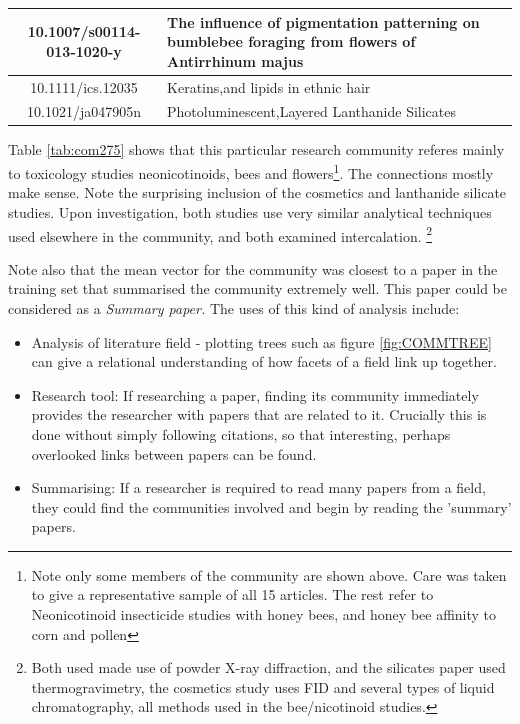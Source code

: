 \begin{table}[H]
\begin{tabular}{||c|p{10cm}||}
10.1007/s00114-013-1020-y        & The influence of pigmentation patterning on bumblebee foraging from flowers of Antirrhinum majus                                                                   \\ \hline
10.1111/ics.12035                & Keratins,and lipids in ethnic hair                                                                                                                                 \\ \hline
10.1021/ja047905n                & Photoluminescent,Layered Lanthanide Silicates                                                                                                                      \\ \hline
\end{tabular}
\end{table}

Table \ref{tab:com275} shows that this particular research community referes mainly to toxicology studies neonicotinoids,  bees and flowers\footnote{Note only some members of the community are shown above. Care was taken to give a representative sample of all 15 articles. The rest refer to Neonicotinoid insecticide studies with honey bees, and honey bee affinity to corn and pollen}. The connections mostly make sense. Note the surprising inclusion of the cosmetics and lanthanide silicate studies. Upon investigation, both studies use very similar analytical techniques used elsewhere in the community, and both examined intercalation.
\footnote{Both used made use of powder X-ray diffraction, and the silicates paper used thermogravimetry, the cosmetics study uses FID and several types of liquid chromatography, all methods used in the bee/nicotinoid studies.}

Note also that the mean vector for the community was closest to a paper in the training set that summarised the community extremely well. This paper could be considered as a \emph{Summary paper.}
The uses of this kind of analysis include:
\begin{itemize}
\item Analysis of literature field - plotting trees such as figure \ref{fig:COMMTREE} can give a relational understanding of how facets of a field link up together. 
\item Research tool: If researching a paper, finding its community immediately provides the researcher with papers that are related to it. Crucially this is done without simply following citations, so that interesting, perhaps overlooked links between papers can be found.
\item Summarising: If a researcher is required to read many papers from a field, they could find the communities involved and begin by reading the 'summary' papers. 
\end{itemize}

